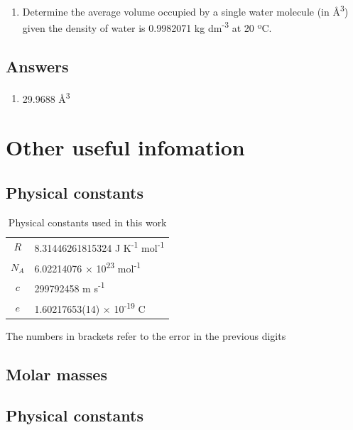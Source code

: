 \documentclass[
]{book}
\providecommand{\tightlist}{%
  \setlength{\itemsep}{0pt}\setlength{\parskip}{0pt}}
\begin{document}
\begin{enumerate}
\def\labelenumi{\arabic{enumi}.}
\tightlist
\item
  Determine the average volume occupied by a single water molecule (in Å\textsuperscript{3}) given the density of water is 0.9982071 kg dm\textsuperscript{-3} at 20 ºC.
\end{enumerate}

\hypertarget{answers}{%
\section{Answers}\label{answers}}

\begin{enumerate}
\def\labelenumi{\arabic{enumi}.}
\tightlist
\item
  29.9688 Å\textsuperscript{3}
\end{enumerate}

\hypertarget{other-useful-infomation}{%
\chapter{Other useful infomation}\label{other-useful-infomation}}

\hypertarget{physical-constants}{%
\section{Physical constants}\label{physical-constants}}

\begin{longtable}[]{@{}cl@{}}
\caption{Physical constants used in this work\label{tab:physicalconst}}\tabularnewline
\toprule
\endhead
\(R\) & 8.31446261815324 J K\textsuperscript{-1} mol\textsuperscript{-1}\tabularnewline
\(N_A\) & 6.02214076 × 10\textsuperscript{23} mol\textsuperscript{-1}\tabularnewline
\(c\) & 299792458 m s\textsuperscript{-1}\tabularnewline
\(e\) & 1.60217653(14) × 10\textsuperscript{-19} C\tabularnewline
\bottomrule
\end{longtable}

The numbers in brackets refer to the error in the previous digits

\hypertarget{molar-masses}{%
\section{Molar masses}\label{molar-masses}}

\hypertarget{physical-constants-1}{%
\section{Physical constants}\label{physical-constants-1}}
\end{document}
